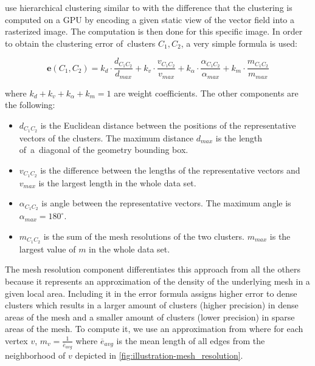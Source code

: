 \citet{Peng12} use hierarchical clustering similar to \citet{Telea99} with the difference that the clustering is computed on a GPU by encoding a given static view of the vector field into a rasterized image. The computation is then done for this specific image. In order to obtain the clustering error of~clusters \(C_1, C_2\), a very simple formula is used:

\begin{equation} \label{eq:clustering_error}
\bm{e}(C_1,C_2) = k_d \cdot \frac{d_{C_1C_2}}{d_{max}} + k_v \cdot \frac{v_{C_1C_2}}{v_{max}} + k_\alpha \cdot \frac{\alpha_{C_1C_2}}{\alpha_{max}} + k_m \cdot \frac{m_{C_1C_2}}{m_{max}}
\end{equation}

where \(k_d + k_v + k_\alpha + k_m = 1\) are weight coefficients. The other components are the following:

\begin{itemize}
\item \(d_{C_1C_2}\) is the Euclidean distance between the positions of the representative vectors of the clusters. The maximum distance \(d_{max}\) is the length of~a~diagonal of the geometry bounding box.
\item \(v_{C_1C_2}\) is the difference between the lengths of the representative vectors and \(v_{max}\) is the largest length in the whole data set.
\item \(\alpha_{C_1C_2}\) is angle between the representative vectors. The maximum angle is \(\alpha_{max} = 180^\circ\).
\item \(m_{C_1C_2}\) is the sum of the mesh resolutions of the two clusters. \(m_{max}\) is the largest value of \(m\) in the whole data set.
\end{itemize}

The mesh resolution component differentiates this approach from all the others because it represents an approximation of the density of the underlying mesh in a given local area\footnotemark. Including it in the error formula assigns higher error to dense clusters which results in a larger amount of clusters (higher precision) in dense areas of the mesh and a smaller amount of clusters (lower precision) in sparse areas of the mesh. To compute it, we use an approximation from \citet{Peng12} where for each vertex \(v\), \(m_v = \frac{1}{{\overline{e}}_{avg}}\) where \(\overline{e}_{avg}\) is the mean length of all edges from the neighborhood of \(v\) depicted in \ref{fig:illustration-mesh_resolution}.


